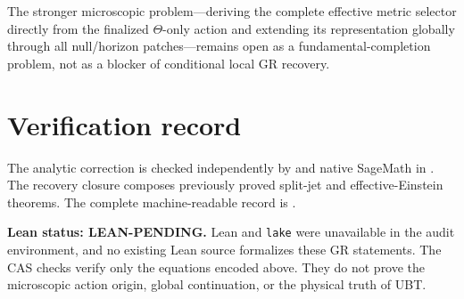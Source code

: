 \documentclass[11pt,a4paper]{article}
\begin{document}
The stronger microscopic problem---deriving the complete effective metric
selector directly from the finalized $\Theta$-only action and extending its
representation globally through all null/horizon patches---remains open as a
fundamental-completion problem, not as a blocker of conditional local GR
recovery.

\section{Verification record}
The analytic correction is checked independently by
 and native SageMath in
.  The recovery closure composes previously
proved split-jet and effective-Einstein theorems.  The complete
machine-readable record is
.

\textbf{Lean status: LEAN-PENDING.}  Lean and \texttt{lake} were unavailable
in the audit environment, and no existing Lean source formalizes these GR
statements.  The CAS checks verify only the equations encoded above.  They do
not prove the microscopic action origin, global continuation, or the physical
truth of UBT.
\end{document}
